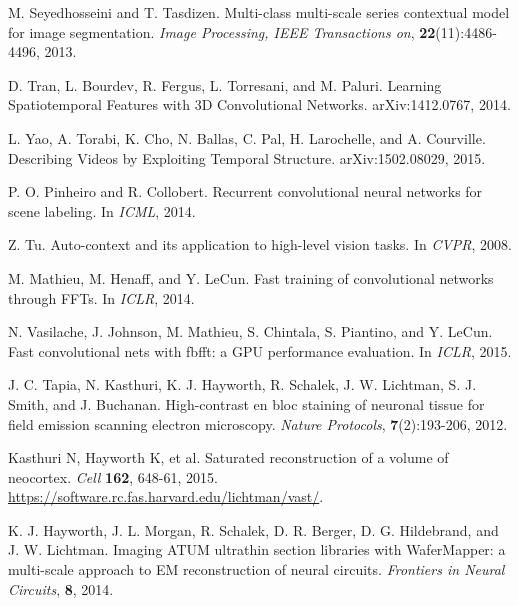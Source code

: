 \documentclass{article} %
\begin{document}
\begin{thebibliography}{9}
{%

M. Seyedhosseini and T. Tasdizen. Multi-class multi-scale series contextual model for image segmentation. {\it Image Processing, IEEE Transactions on}, {\bf 22}(11):4486-4496, 2013.

D. Tran, L. Bourdev, R. Fergus, L. Torresani, and M. Paluri. Learning Spatiotemporal Features with 3D Convolutional Networks. arXiv:1412.0767, 2014.

L. Yao, A. Torabi, K. Cho, N. Ballas, C. Pal, H. Larochelle, and A. Courville. Describing Videos by Exploiting Temporal Structure.
arXiv:1502.08029, 2015.

P. O. Pinheiro and R. Collobert. Recurrent convolutional neural networks for scene labeling. In {\it ICML}, 2014.

Z. Tu. Auto-context and its application to high-level vision tasks. In {\it CVPR}, 2008.


M. Mathieu, M. Henaff, and Y. LeCun. Fast training of convolutional networks through FFTs. In {\it ICLR}, 2014.

N. Vasilache, J. Johnson, M. Mathieu, S. Chintala, S. Piantino, and Y. LeCun. Fast convolutional nets with fbfft: a GPU performance evaluation. In {\it ICLR}, 2015.

J. C. Tapia, N. Kasthuri, K. J. Hayworth, R. Schalek, J. W. Lichtman, S. J. Smith, and J. Buchanan. High-contrast en bloc staining of neuronal tissue for field emission scanning electron microscopy. {\it Nature Protocols}, {\bf 7}(2):193-206, 2012.

Kasthuri N, Hayworth K, et al. Saturated
reconstruction of a volume of neocortex. {\em Cell} {\bf 162}, 648-61, 2015.
\url{https://software.rc.fas.harvard.edu/lichtman/vast/}.

K. J. Hayworth, J. L. Morgan, R. Schalek, D. R. Berger, D. G. Hildebrand, and J. W. Lichtman. Imaging ATUM ultrathin section libraries with WaferMapper: a multi-scale approach to EM reconstruction of neural circuits. {\it Frontiers in Neural Circuits}, {\bf 8}, 2014.

}
\end{thebibliography}
\end{document}
